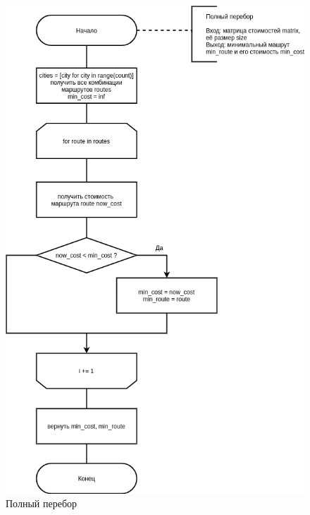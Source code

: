\begin{figure}[H]
	\begin{center}
		\includegraphics[scale=0.6]{img/brute.png}
	\end{center}
	\captionsetup{justification=centering}
	\caption{Полный перебор}
	\label{img:brute}
\end{figure}

